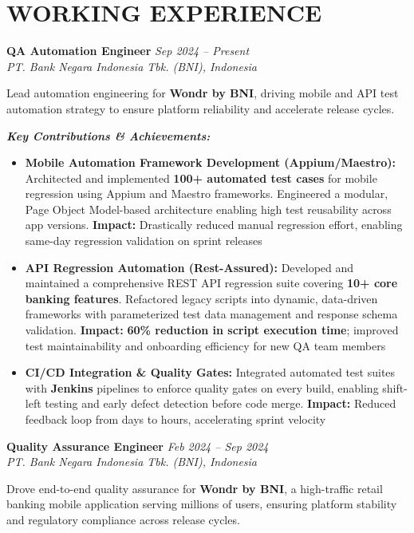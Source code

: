 \documentclass[10pt,a4paper]{article}
\newcommand{\experience}[4]{%
    \noindent\textbf{#1} \hfill \textit{#2}\\
    \textit{#3} \hfill #4\vspace{2pt}
}
\begin{document}
\section*{WORKING EXPERIENCE}

\experience{QA Automation Engineer}{Sep 2024 -- Present}{PT. Bank Negara Indonesia Tbk. (BNI), Indonesia}{}

Lead automation engineering for \textbf{Wondr by BNI}, driving mobile and API test automation strategy to ensure platform reliability and accelerate release cycles.

\textit{\textbf{Key Contributions \& Achievements:}}
\begin{itemize}
    \item \textbf{Mobile Automation Framework Development (Appium/Maestro):} Architected and implemented \textbf{100+ automated test cases} for mobile regression using Appium and Maestro frameworks. Engineered a modular, Page Object Model-based architecture enabling high test reusability across app versions. \textcolor{accent}{\textbf{Impact:}} Drastically reduced manual regression effort, enabling same-day regression validation on sprint releases
    \item \textbf{API Regression Automation (Rest-Assured):} Developed and maintained a comprehensive REST API regression suite covering \textbf{10+ core banking features}. Refactored legacy scripts into dynamic, data-driven frameworks with parameterized test data management and response schema validation. \textcolor{accent}{\textbf{Impact:}} \textbf{60\% reduction in script execution time}; improved test maintainability and onboarding efficiency for new QA team members
    \item \textbf{CI/CD Integration \& Quality Gates:} Integrated automated test suites with \textbf{Jenkins} pipelines to enforce quality gates on every build, enabling shift-left testing and early defect detection before code merge. \textcolor{accent}{\textbf{Impact:}} Reduced feedback loop from days to hours, accelerating sprint velocity
\end{itemize}

\vspace{4pt}

\experience{Quality Assurance Engineer}{Feb 2024 -- Sep 2024}{PT. Bank Negara Indonesia Tbk. (BNI), Indonesia}{}

Drove end-to-end quality assurance for \textbf{Wondr by BNI}, a high-traffic retail banking mobile application serving millions of users, ensuring platform stability and regulatory compliance across release cycles.
\end{document}
